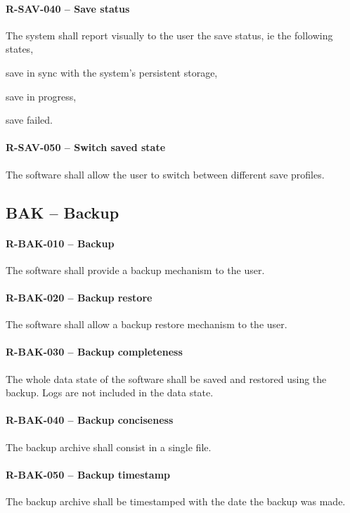 \paragraph{R-SAV-040 -- Save status}
The system shall report visually to the user the save status, ie
the following states,
\begin{compactitem}
  \item save in sync with the system's persistent storage,
  \item save in progress,
  \item save failed.
\end{compactitem}

\paragraph{R-SAV-050 -- Switch saved state}
The software shall allow the user to switch between different save profiles.

\subsection{BAK -- Backup}
\paragraph{R-BAK-010 -- Backup}
The software shall provide a backup mechanism to the user.

\paragraph{R-BAK-020 -- Backup restore}
The software shall allow a backup restore mechanism to the user.

\paragraph{R-BAK-030 -- Backup completeness}
The whole data state of the software shall be saved and restored using the
backup. Logs are not included in the data state.

\paragraph{R-BAK-040 -- Backup conciseness}
The backup archive shall consist in a single file.

\paragraph{R-BAK-050 -- Backup timestamp}
The backup archive shall be timestamped with the date the backup was made.

